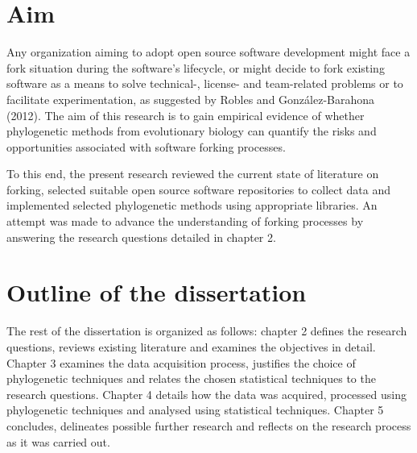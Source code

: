 
\section{Aim}
Any organization aiming to adopt open source software development might face a fork situation during the software's lifecycle, or might decide to fork existing software as a means to solve technical-, license- and team-related problems or to facilitate experimentation, as suggested by Robles and González-Barahona (2012). The aim of this research is to gain empirical evidence of whether phylogenetic methods from evolutionary biology can quantify the risks and opportunities associated with software forking processes.

To this end, the present research reviewed the current state of literature on forking, selected suitable open source software repositories to collect data and implemented selected phylogenetic methods using appropriate libraries. An attempt was made to advance the understanding of forking processes by answering the research questions detailed in chapter 2.


\section{Outline of the dissertation}
The rest of the dissertation is organized as follows: chapter 2 defines the research questions, reviews existing literature and examines the objectives in detail. Chapter 3 examines the data acquisition process, justifies the choice of phylogenetic techniques and relates the chosen statistical techniques to the research questions. Chapter 4 details how the data was acquired, processed using phylogenetic techniques and analysed using statistical techniques. Chapter 5 concludes, delineates possible further research and reflects on the research process as it was carried out.